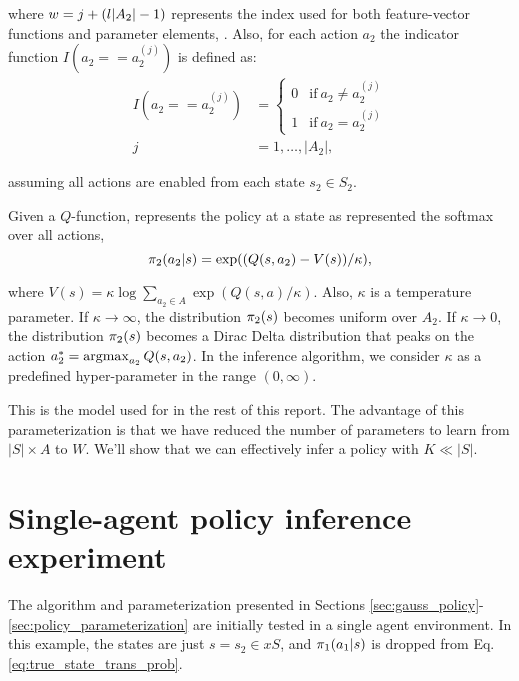     \noindent
    where $w=j+(l|A_2|-1)$ represents the index used for both feature-vector functions and parameter elements,
    \paramElem. Also, for each action $a_2$ the indicator function ${I(a_2==a_2^{(j)})}$ is defined as:
    \begin{equation*}
        \begin{aligned}
            I(a_2==a_2^{(j)}) & = \begin{cases}
                                      0 & \text{if}\ a_2 \neq a_2^{(j)} \\
                                      1 & \text{if}\ a_2 = a_2^{(j)}
                                  \end{cases} \\
            j & = 1, \ldots, |A_2|,
        \end{aligned}
    \end{equation*}

    \noindent
    assuming all actions are enabled from each state $s_2 \in S_2$.

    Given a $Q$-function, \cite{nachum2017bridging} represents the policy at a state as represented the softmax over all
    actions,
    \begin{equation}\label{eq:policy_model}
        \pi_{2}(a_2|s) = \exp((Q(s,a_2)- V(s))/\kappa),
    \end{equation}

    \noindent
    where $V(s) = \kappa\log \sum_{a_2\in A}\exp (Q(s,a)/\kappa)$. Also, $\kappa$ is a temperature parameter. If $\kappa
    \rightarrow \infty$, the distribution $ \pi_{2}(s) $ becomes uniform over $A_2$. If $\kappa \rightarrow 0$, the
    distribution $\pi_{2}(s)$ becomes a Dirac Delta distribution that peaks on the action $a_2^\ast = \mathop{\mathrm{argmax}}_{a_2}
    Q(s,a_2)$. In the inference algorithm, we consider $\kappa$ as a predefined hyper-parameter in the range
    $(0,\infty)$.

    This is the model used for  in the rest of this report. The advantage of this parameterization is that we
    have reduced the number of parameters to learn from $|S|\times A$ to $W$. We'll show that we can effectively infer a
    policy with $K \ll |S|$.

\section{Single-agent policy inference experiment}\label{sec:single_agent_experiment}
    The algorithm and parameterization presented in Sections \ref{sec:gauss_policy}-\ref{sec:policy_parameterization}
    are initially tested in a single agent environment. In this example, the states are just $s=s_2 \in xS$, and
    $\pi_{1}(a_1|s)$ is dropped from Eq. \ref{eq:true_state_trans_prob}.

